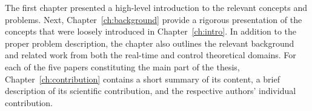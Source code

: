 The first chapter presented a high-level introduction to the relevant concepts and problems.
Next, Chapter~\ref{ch:background} provide a rigorous presentation of the concepts that were loosely introduced in Chapter~\ref{ch:intro}.
In addition to the proper problem description, the chapter also outlines the relevant background and related work from both the real-time and control theoretical domains.
For each of the five papers constituting the main part of the thesis, Chapter~\ref{ch:contribution} contains a short summary of its content, a brief description of its scientific contribution, and the respective authors' individual contribution.
